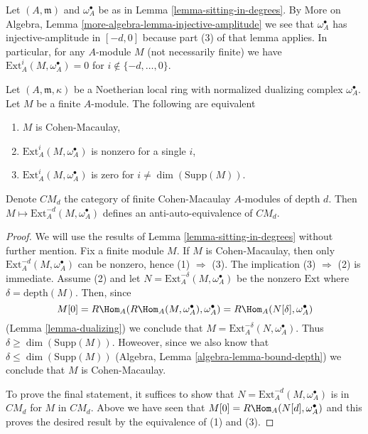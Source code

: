 \begin{remark}
\label{remark-vanishing-for-arbitrary-modules}
Let $(A, \mathfrak m)$ and $\omega_A^\bullet$ be as in
Lemma \ref{lemma-sitting-in-degrees}.
By More on Algebra, Lemma \ref{more-algebra-lemma-injective-amplitude}
we see that $\omega_A^\bullet$ has injective-amplitude in $[-d, 0]$
because part (3) of that lemma applies.
In particular, for any $A$-module $M$ (not necessarily finite) we have
$\text{Ext}^i_A(M, \omega_A^\bullet) = 0$ for $i \not \in \{-d, \ldots, 0\}$.
\end{remark}

\begin{lemma}
\label{lemma-local-CM}
Let $(A, \mathfrak m, \kappa)$ be a Noetherian local ring
with normalized dualizing complex $\omega_A^\bullet$. Let $M$
be a finite $A$-module. The following are equivalent
\begin{enumerate}
\item $M$ is Cohen-Macaulay,
\item $\text{Ext}^i_A(M, \omega_A^\bullet)$ is nonzero for a single $i$,
\item $\text{Ext}^i_A(M, \omega_A^\bullet)$ is zero for
$i \not = \dim(\text{Supp}(M))$.
\end{enumerate}
Denote $CM_d$ the category of finite Cohen-Macaulay $A$-modules
of depth $d$. Then $M \mapsto \text{Ext}^{-d}_A(M, \omega_A^\bullet)$
defines an anti-auto-equivalence of $CM_d$.
\end{lemma}

\begin{proof}
We will use the results of Lemma \ref{lemma-sitting-in-degrees}
without further mention. Fix a finite module $M$.
If $M$ is Cohen-Macaulay, then only
$\text{Ext}^{-d}_A(M, \omega_A^\bullet)$ can be nonzero,
hence (1) $\Rightarrow$ (3).
The implication (3) $\Rightarrow$ (2) is immediate.
Assume (2) and let $N = \text{Ext}^{-\delta}_A(M, \omega_A^\bullet)$
be the nonzero $\text{Ext}$ where $\delta = \text{depth}(M)$. Then, since
$$
M[0] = R\Hom_A(R\Hom_A(M, \omega_A^\bullet), \omega_A^\bullet) =
R\Hom_A(N[\delta], \omega_A^\bullet)
$$
(Lemma \ref{lemma-dualizing})
we conclude that $M = \text{Ext}_A^{-\delta}(N, \omega_A^\bullet)$.
Thus $\delta \geq \dim(\text{Supp}(M))$. Howeover,
since we also know that $\delta \leq \dim(\text{Supp}(M))$
(Algebra, Lemma \ref{algebra-lemma-bound-depth}) we conclude that $M$ is
Cohen-Macaulay.

\medskip\noindent
To prove the final statement, it suffices to show that
$N = \text{Ext}^{-d}_A(M, \omega_A^\bullet)$ is in $CM_d$
for $M$ in $CM_d$. Above we have seen that
$M[0] = R\Hom_A(N[d], \omega_A^\bullet)$ and this proves the
desired result by the equivalence of (1) and (3).
\end{proof}

